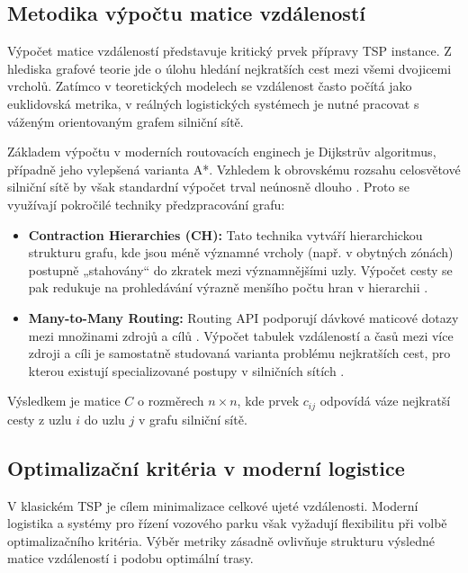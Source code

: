 \subsection{Metodika výpočtu matice vzdáleností}
Výpočet matice vzdáleností představuje kritický prvek přípravy TSP instance. Z hlediska grafové teorie jde o úlohu hledání nejkratších cest mezi všemi dvojicemi vrcholů. Zatímco v teoretických modelech se vzdálenost často počítá jako euklidovská metrika, v reálných logistických systémech je nutné pracovat s váženým orientovaným grafem silniční sítě.

Základem výpočtu v moderních routovacích enginech je Dijkstrův algoritmus, případně jeho vylepšená varianta A*. Vzhledem k obrovskému rozsahu celosvětové silniční sítě by však standardní výpočet trval neúnosně dlouho \cite{bast2016route_planning_survey}. Proto se využívají pokročilé techniky předzpracování grafu:

\begin{itemize}
    \item \textbf{Contraction Hierarchies (CH):} Tato technika vytváří hierarchickou strukturu grafu, kde jsou méně významné vrcholy (např. v obytných zónách) postupně „stahovány“ do zkratek mezi významnějšími uzly. Výpočet cesty se pak redukuje na prohledávání výrazně menšího počtu hran v hierarchii \cite{geisberger2008ch}.
    \item \textbf{Many-to-Many Routing:} Routing API podporují dávkové maticové dotazy mezi množinami zdrojů a cílů \cite{ors_matrix_docs,osrm_backend_readme}. Výpočet tabulek vzdáleností a časů mezi více zdroji a cíli je samostatně studovaná varianta problému nejkratších cest, pro kterou existují specializované postupy v silničních sítích \cite{knopp2007many_to_many,bast2016route_planning_survey}.
\end{itemize}

Výsledkem je matice $C$ o rozměrech $n \times n$, kde prvek $c_{ij}$ odpovídá váze nejkratší cesty z uzlu $i$ do uzlu $j$ v grafu silniční sítě.

\subsection{Optimalizační kritéria v moderní logistice}
V klasickém TSP je cílem minimalizace celkové ujeté vzdálenosti. Moderní logistika a systémy pro řízení vozového parku však vyžadují flexibilitu při volbě optimalizačního kritéria. Výběr metriky zásadně ovlivňuje strukturu výsledné matice vzdáleností i podobu optimální trasy.

